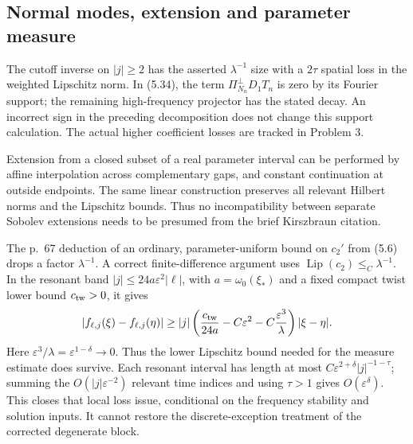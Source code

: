 \documentclass[10pt]{article}
\begin{document}
\subsection*{Normal modes, extension and parameter measure}
The cutoff inverse on \(|j|\ge2\) has the asserted \(\lambda^{-1}\) size with a \(2\tau\) spatial loss in the weighted Lipschitz norm. In (5.34), the term \(\Pi_{N_n}^{\perp}D_1T_n\) is zero by its Fourier support; the remaining high-frequency projector has the stated decay. An incorrect sign in the preceding decomposition does not change this support calculation. The actual higher coefficient losses are tracked in Problem 3.\par
Extension from a closed subset of a real parameter interval can be performed by affine interpolation across complementary gaps, and constant continuation at outside endpoints. The same linear construction preserves all relevant Hilbert norms and the Lipschitz bounds. Thus no incompatibility between separate Sobolev extensions needs to be presumed from the brief Kirszbraun citation.\par
The p. 67 deduction of an ordinary, parameter-uniform bound on \(c_2'\) from (5.6) drops a factor \(\lambda^{-1}\). A correct finite-difference argument uses \(\operatorname{Lip}(c_2)\mathrel{\leq_C}\lambda^{-1}\). In the resonant band \(|j|\le24a\varepsilon^2|\ell|\), with \(a=\omega_0(\xi_*)\) and a fixed compact twist lower bound \(c_{\rm tw}>0\), it gives \[|f_{\ell,j}(\xi)-f_{\ell,j}(\eta)|
 \ge |j|\left(\frac{c_{\rm tw}}{24a}
          -C\varepsilon^2-C\frac{\varepsilon^3}{\lambda}\right)|\xi-\eta|.\] Here \(\varepsilon^3/\lambda=\varepsilon^{1-\delta}\to0\). Thus the lower Lipschitz bound needed for the measure estimate does survive. Each resonant interval has length at most \(C\varepsilon^{2+\delta}|j|^{-1-\tau}\); summing the \(O(|j|\varepsilon^{-2})\) relevant time indices and using \(\tau>1\) gives \(O(\varepsilon^\delta)\). This closes that local loss issue, conditional on the frequency stability and solution inputs. It cannot restore the discrete-exception treatment of the corrected degenerate block.\par
\end{document}

